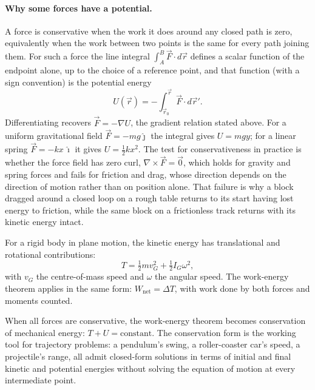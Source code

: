 \paragraph{Why some forces have a potential.} A force is conservative
when the work it does around any closed path is zero, equivalently when
the work between two points is the same for every path joining them. For
such a force the line integral $\int_{A}^{B}\vec{F}\cdot d\vec{r}$
defines a scalar function of the endpoint alone, up to the choice of a
reference point, and that function (with a sign convention) is the
potential energy
\[
U(\vec{r})=-\int_{\vec{r}_{0}}^{\vec{r}}\vec{F}\cdot d\vec{r}'.
\]
Differentiating recovers $\vec{F}=-\nabla U$, the gradient relation
stated above. For a uniform gravitational field $\vec{F}=-mg\hat{\jmath}$
the integral gives $U=mgy$; for a linear spring $\vec{F}=-kx\,\hat{\imath}$
it gives $U=\tfrac{1}{2}kx^{2}$. The test for conservativeness in
practice is whether the force field has zero curl, $\nabla\times\vec{F}=
\vec{0}$, which holds for gravity and spring forces and fails for
friction and drag, whose direction depends on the direction of motion
rather than on position alone. That failure is why a block dragged
around a closed loop on a rough table returns to its start having lost
energy to friction, while the same block on a frictionless track returns
with its kinetic energy intact.

For a rigid body in plane motion, the kinetic energy has translational
and rotational contributions:
\[
T = \tfrac{1}{2} m v_G^2 + \tfrac{1}{2} I_G \omega^2,
\]
with $v_G$ the centre-of-mass speed and $\omega$ the angular speed.
The work-energy theorem applies in the same form: $W_{\text{net}} =
\Delta T$, with work done by both forces and moments counted.

When all forces are conservative, the work-energy theorem becomes
conservation of mechanical energy: $T + U = \text{constant}$. The
conservation form is the working tool for trajectory problems: a
pendulum's swing, a roller-coaster car's speed, a projectile's range,
all admit closed-form solutions in terms of initial and final
kinetic and potential energies without solving the equation of
motion at every intermediate point.

